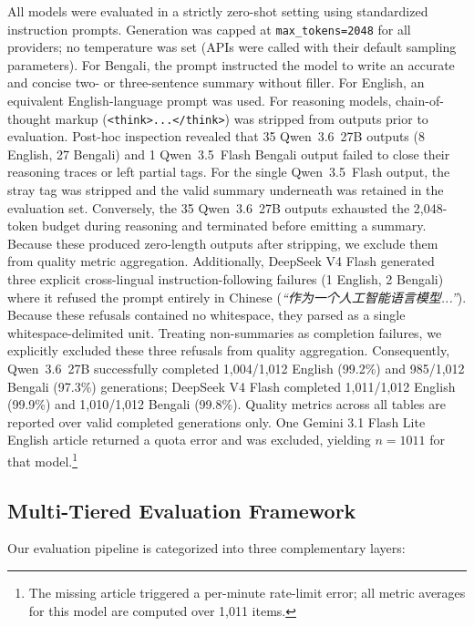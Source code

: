 \documentclass[runningheads]{llncs}
\begin{document}
All models were evaluated in a strictly zero-shot setting using standardized instruction prompts. Generation was capped at \texttt{max\_tokens=2048} for all providers; no temperature was set (APIs were called with their default sampling parameters). For Bengali, the prompt instructed the model to write an accurate and concise two- or three-sentence summary without filler. For English, an equivalent English-language prompt was used. For reasoning models, chain-of-thought markup (\texttt{<think>...</think>}) was stripped from outputs prior to evaluation. Post-hoc inspection revealed that 35 Qwen~3.6~27B outputs (8 English, 27 Bengali) and 1 Qwen~3.5~Flash Bengali output failed to close their reasoning traces or left partial tags. For the single Qwen~3.5~Flash output, the stray tag was stripped and the valid summary underneath was retained in the evaluation set. Conversely, the 35 Qwen~3.6~27B outputs exhausted the 2,048-token budget during reasoning and terminated before emitting a summary. Because these produced zero-length outputs after stripping, we exclude them from quality metric aggregation. Additionally, DeepSeek V4 Flash generated three explicit cross-lingual instruction-following failures (1 English, 2 Bengali) where it refused the prompt entirely in Chinese (\emph{``作为一个人工智能语言模型...''}). Because these refusals contained no whitespace, they parsed as a single whitespace-delimited unit. Treating non-summaries as completion failures, we explicitly excluded these three refusals from quality aggregation. Consequently, Qwen~3.6~27B successfully completed 1,004/1,012 English (99.2\%) and 985/1,012 Bengali (97.3\%) generations; DeepSeek V4 Flash completed 1,011/1,012 English (99.9\%) and 1,010/1,012 Bengali (99.8\%). Quality metrics across all tables are reported over valid completed generations only. One Gemini 3.1 Flash Lite English article returned a quota error and was excluded, yielding $n=1011$ for that model.\footnote{The missing article triggered a per-minute rate-limit error; all metric averages for this model are computed over 1,011 items.}

\subsection{Multi-Tiered Evaluation Framework}\label{subsec:evaluation_framework}

Our evaluation pipeline is categorized into three complementary layers:
\end{document}
